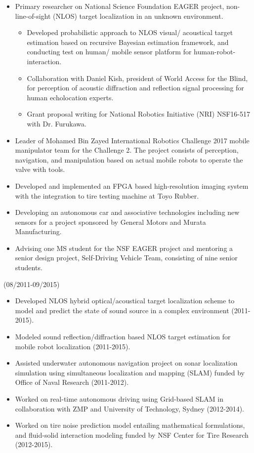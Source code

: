 \documentclass[10pt,letterpaper]{article}
\begin{document}
  \begin{itemize}
  	\item Primary researcher on National Science Foundation EAGER project, non-line-of-sight (NLOS) target localization in an unknown environment.
  	\begin{itemize}
  		\item Developed probabilistic approach to NLOS visual/ acoustical target estimation based on recursive Bayesian estimation framework, and conducting test on human/ mobile sensor platform for human-robot-interaction.
  		\item Collaboration with Daniel Kish, president of World Access for the Blind, for perception of acoustic diffraction and reflection signal processing for human echolocation experts.
  		\item Grant proposal writing for National Robotics Initiative (NRI) NSF16-517 with Dr. Furukawa.
  	\end{itemize}
  	\item Leader of Mohamed Bin Zayed International Robotics Challenge 2017 mobile manipulator team for the Challenge 2. The project consists of perception, navigation, and manipulation based on actual mobile robots to operate the valve with tools.
  	\item Developed and implemented an FPGA based high-resolution imaging system with the integration to tire testing machine at Toyo Rubber.
  	\item Developing an autonomous car and associative technologies including new sensors for a project sponsored by General Motors and Murata Manufacturing. \item Advising one MS student for the NSF EAGER project and mentoring a senior design project, Self-Driving Vehicle Team, consisting of nine senior students.
  \end{itemize}

  \hfill {(08/2011-09/2015)}\\
  \begin{itemize}
  \item Developed NLOS hybrid optical/acoustical target localization scheme to model and predict the state of sound source in a complex environment (2011-2015).
  \item Modeled sound reflection/diffraction based NLOS target estimation for mobile robot localization (2011-2015).
  \item Assisted underwater autonomous navigation project on sonar localization simulation using simultaneous localization and mapping (SLAM) funded by Office of Naval Research (2011-2012).
  \item Worked on real-time autonomous driving using Grid-based SLAM in collaboration with ZMP and University of Technology, Sydney (2012-2014).
  \item Worked on tire noise prediction model entailing mathematical formulations, and fluid-solid interaction modeling funded by NSF Center for Tire Research (2012-2015).
  \end{itemize}
\end{document}
